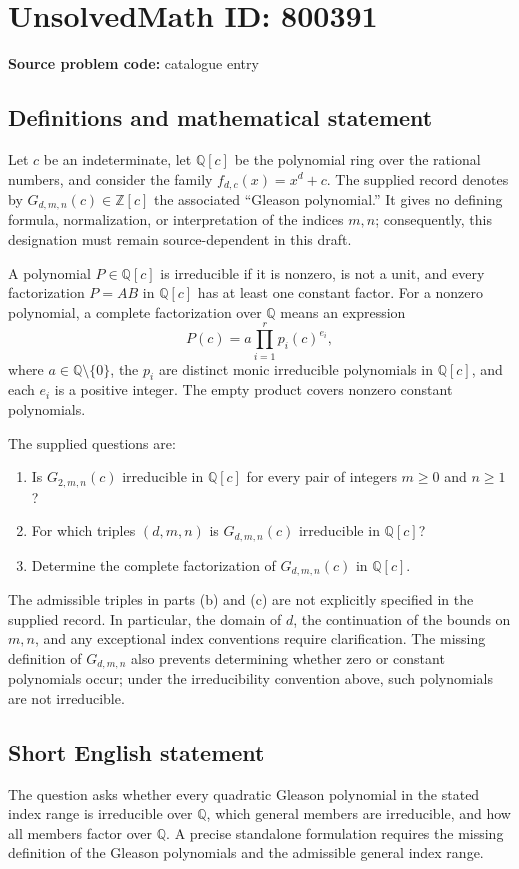 \documentclass[11pt]{article}
\newcommand{\Z}{\mathbb{Z}}
\newcommand{\Q}{\mathbb{Q}}
\begin{document}
\section*{UnsolvedMath ID: 800391}
\textbf{Source problem code:} catalogue entry
\subsection{Definitions and mathematical statement}
Let \(c\) be an indeterminate, let \(\Q[c]\) be the polynomial ring over the rational numbers, and consider the family \(f_{d,c}(x)=x^d+c\). The supplied record denotes by \(G_{d,m,n}(c)\in\Z[c]\) the associated ``Gleason polynomial.'' It gives no defining formula, normalization, or interpretation of the indices \(m,n\); consequently, this designation must remain source-dependent in this draft.

A polynomial \(P\in\Q[c]\) is irreducible if it is nonzero, is not a unit, and every factorization \(P=AB\) in \(\Q[c]\) has at least one constant factor. For a nonzero polynomial, a complete factorization over \(\Q\) means an expression
\[
P(c)=a\prod_{i=1}^{r}p_i(c)^{e_i},
\]
where \(a\in\Q\setminus\{0\}\), the \(p_i\) are distinct monic irreducible polynomials in \(\Q[c]\), and each \(e_i\) is a positive integer. The empty product covers nonzero constant polynomials.

The supplied questions are:
\begin{enumerate}
\item[(a)] Is \(G_{2,m,n}(c)\) irreducible in \(\Q[c]\) for every pair of integers \(m\geq 0\) and \(n\geq 1\)?
\item[(b)] For which triples \((d,m,n)\) is \(G_{d,m,n}(c)\) irreducible in \(\Q[c]\)?
\item[(c)] Determine the complete factorization of \(G_{d,m,n}(c)\) in \(\Q[c]\).
\end{enumerate}
The admissible triples in parts (b) and (c) are not explicitly specified in the supplied record. In particular, the domain of \(d\), the continuation of the bounds on \(m,n\), and any exceptional index conventions require clarification. The missing definition of \(G_{d,m,n}\) also prevents determining whether zero or constant polynomials occur; under the irreducibility convention above, such polynomials are not irreducible.
\subsection{Short English statement}
The question asks whether every quadratic Gleason polynomial in the stated index range is irreducible over \(\Q\), which general members are irreducible, and how all members factor over \(\Q\). A precise standalone formulation requires the missing definition of the Gleason polynomials and the admissible general index range.
\end{document}
